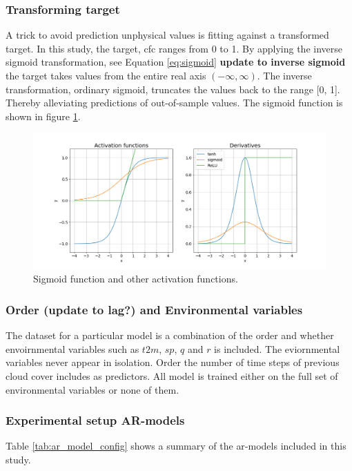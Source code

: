 \subsubsection{Transforming target} \label{sec:transforming_target}
A trick to avoid prediction unphysical values is fitting against a transformed target. In this study, the target, \acrfull{cfc} ranges from 0 to 1. By applying the inverse sigmoid transformation, see Equation \ref{eq:sigmoid} \textbf{update to inverse sigmoid} the target takes values from the entire real axis $(-\infty, \infty)$. 
The inverse transformation, ordinary sigmoid, truncates the values back to the range [0, 1]. Thereby alleviating predictions of out-of-sample values. The sigmoid function is shown in figure \ref{fig:activation_func_plus}. 
\begin{figure}
    \centering
    \includegraphics[scale=0.45]{Chapter3_Method/figs/activation_functions_and_derivatives.png}
    \caption{Sigmoid function and other activation functions.}
    \label{fig:activation_func_plus}
\end{figure}

\subsubsection{Order \textbf{(update to lag?)} and Environmental variables}
The dataset for a particular model is a combination of the order and whether envoirnmental variables such as $t2m$, $sp$, $q$ and $r$ is included. The eviornmental variables never appear in isolation.
Order the number of time steps of previous cloud cover includes as predictors.%
All model is trained either on the full set of environmental variables or none of them.

\subsubsection{Experimental setup AR-models}
Table \ref{tab:ar_model_config} shows a summary of the \acrshort{ar}-models included in this study. 


